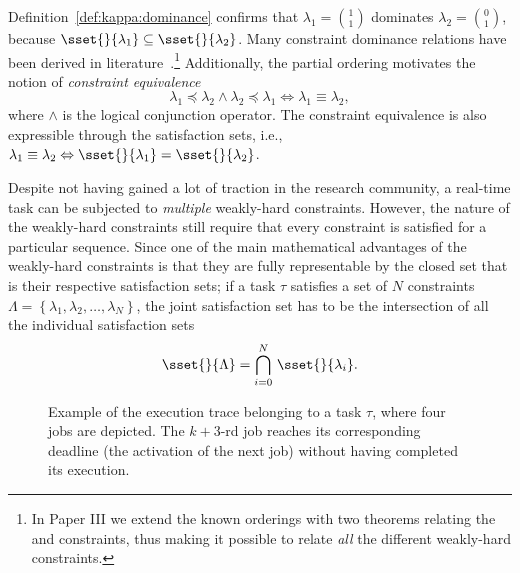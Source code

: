 %
Definition~\ref{def:kappa:dominance} confirms that $\lambda_1 = \binom{1}{1}$ dominates $\lambda_2 = \binom{0}{1}$, because $\sset{}{\lambda_1} \subseteq \sset{}{\lambda_2}$.
Many constraint dominance relations have been derived in literature~\cite{Bernat:2001}.\footnote{In Paper III we extend the known orderings with two theorems relating the \tAH{} and \tRH{} constraints, thus making it possible to relate \emph{all} the different weakly-hard constraints.}
Additionally, the partial ordering motivates the notion of \emph{constraint equivalence}
%
\begin{equation*}
    \lambda_1 \preceq \lambda_2 \land \lambda_2 \preceq \lambda_1 \Leftrightarrow \lambda_1 \equiv \lambda_2,
\end{equation*}
%
where $\land$ is the logical conjunction operator.
The constraint equivalence is also expressible through the satisfaction sets, i.e., $\lambda_1 \equiv \lambda_2 \Leftrightarrow \sset{}{\lambda_1} = \sset{}{\lambda_2}$.

Despite not having gained a lot of traction in the research community, a real-time task can be subjected to \emph{multiple} weakly-hard constraints.
However, the nature of the weakly-hard constraints still require that every constraint is satisfied for a particular sequence.
Since one of the main mathematical advantages of the weakly-hard constraints is that they are fully representable by the closed set that is their respective satisfaction sets; if a task $\tau$ satisfies a set of $N$ constraints $\Lambda = \left\{ \lambda_1, \lambda_2, \ldots, \lambda_N \right\}$, the joint satisfaction set has to be the intersection of all the individual satisfaction sets
%
\begin{equation*}
    \sset{}{\Lambda} = \bigcap_{i=0}^N \, \sset{}{\lambda_i}.
\end{equation*}

\begin{figure}[t]
    \centering
    
    \caption{Example of the execution trace belonging to a task $\tau$, where four jobs are depicted.
    The $k+3$-rd job reaches its corresponding deadline (the activation of the next job) without having completed its execution.}
    \label{fig:schedule}
\end{figure}

